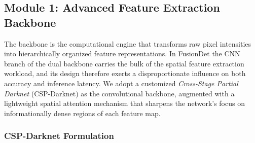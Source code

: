 
\subsection{Module 1: Advanced Feature Extraction Backbone}

The backbone is the computational engine that transforms raw
pixel intensities into hierarchically organized feature
representations. In FusionDet the CNN branch of the dual
backbone carries the bulk of the spatial feature extraction
workload, and its design therefore exerts a disproportionate
influence on both accuracy and inference latency. We adopt a
customized \textit{Cross-Stage Partial Darknet}
(CSP-Darknet) \cite{wang2020cspnet} as the convolutional
backbone, augmented with a lightweight spatial attention
mechanism that sharpens the network's focus on
informationally dense regions of each feature map.

\subsubsection{CSP-Darknet Formulation}


